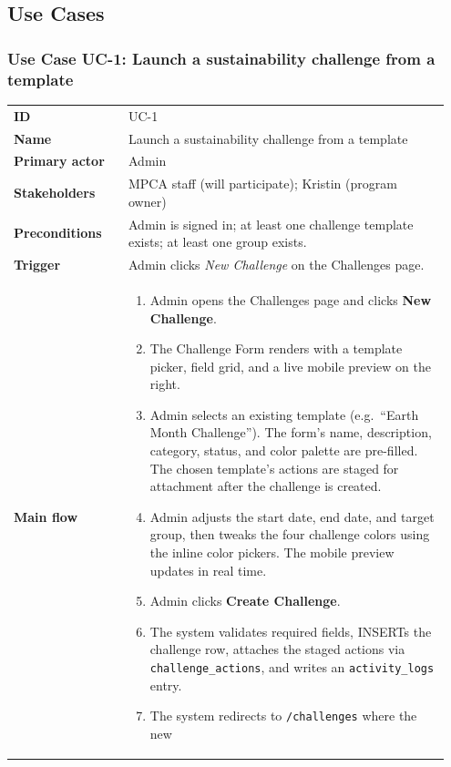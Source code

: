 \documentclass[11pt,letterpaper]{article}
\begin{document}
\subsection{Use Cases}

\subsubsection*{Use Case UC-1: Launch a sustainability challenge from a template}

\begin{longtable}{p{0.25\linewidth} p{0.7\linewidth}}
\toprule
\textbf{ID}         & UC-1 \\
\textbf{Name}       & Launch a sustainability challenge from a template \\
\textbf{Primary actor} & Admin \\
\textbf{Stakeholders} & MPCA staff (will participate); Kristin (program owner) \\
\textbf{Preconditions} & Admin is signed in; at least one challenge template exists; at least one group exists. \\
\textbf{Trigger}    & Admin clicks \textit{New Challenge} on the Challenges page. \\
\midrule
\textbf{Main flow} & \begin{enumerate}[noitemsep,leftmargin=*]
  \item Admin opens the Challenges page and clicks \textbf{New Challenge}.
  \item The Challenge Form renders with a template picker, field grid,
        and a live mobile preview on the right.
  \item Admin selects an existing template (e.g.\ ``Earth Month
        Challenge''). The form's name, description, category, status,
        and color palette are pre-filled. The chosen template's actions
        are staged for attachment after the challenge is created.
  \item Admin adjusts the start date, end date, and target group, then
        tweaks the four challenge colors using the inline color pickers.
        The mobile preview updates in real time.
  \item Admin clicks \textbf{Create Challenge}.
  \item The system validates required fields, INSERTs the challenge
        row, attaches the staged actions via \texttt{challenge\_actions},
        and writes an \texttt{activity\_logs} entry.
  \item The system redirects to \texttt{/challenges} where the new

\end{enumerate}
\end{longtable}
\end{document}
